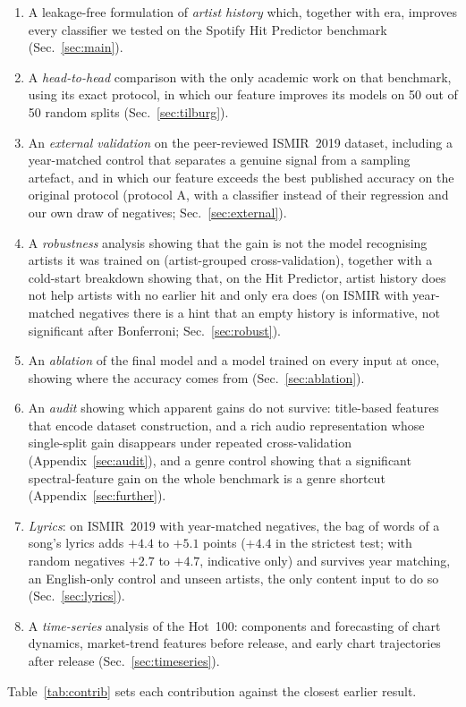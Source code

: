 \documentclass[conference]{IEEEtran}
\begin{document}
\begin{enumerate}
\item A leakage-free formulation of \emph{artist history} which, together with era, improves every
classifier we tested on the Spotify Hit Predictor benchmark (Sec.~\ref{sec:main}).
\item A \emph{head-to-head} comparison with the only academic work on that benchmark, using
its exact protocol, in which our feature improves its models on 50 out of 50 random splits
(Sec.~\ref{sec:tilburg}).
\item An \emph{external validation} on the peer-reviewed ISMIR~2019 dataset, including a
year-matched control that separates a genuine signal from a sampling artefact, and in which
our feature exceeds the best published accuracy on the original protocol (protocol A, with a classifier
instead of their regression and our own draw of negatives; Sec.~\ref{sec:external}).
\item A \emph{robustness} analysis showing that the gain is not the model recognising artists it was
trained on (artist-grouped cross-validation), together with a cold-start breakdown showing that, on the
Hit Predictor, artist history does not help artists with no earlier hit and only era does (on ISMIR with
year-matched negatives there is a hint that an empty history is informative, not significant after Bonferroni;
Sec.~\ref{sec:robust}).
\item An \emph{ablation} of the final model and a model trained on every input at once, showing where
the accuracy comes from (Sec.~\ref{sec:ablation}).
\item An \emph{audit} showing which apparent gains do not survive: title-based features that
encode dataset construction, and a rich audio representation whose single-split gain
disappears under repeated cross-validation (Appendix~\ref{sec:audit}), and a genre control
showing that a significant spectral-feature gain on the whole benchmark is a genre
shortcut (Appendix~\ref{sec:further}).
\item \emph{Lyrics}: on ISMIR~2019 with year-matched negatives, the bag of words of a song's lyrics adds $+4.4$ to
$+5.1$ points ($+4.4$ in the strictest test; with random negatives $+2.7$ to $+4.7$, indicative only) and survives year matching, an English-only control and unseen artists, the only content input
to do so (Sec.~\ref{sec:lyrics}).
\item A \emph{time-series} analysis of the Hot~100: components and forecasting of chart
dynamics, market-trend features before release, and early chart trajectories after release
(Sec.~\ref{sec:timeseries}).
\end{enumerate}
Table~\ref{tab:contrib} sets each contribution against the closest earlier result.
\end{document}
